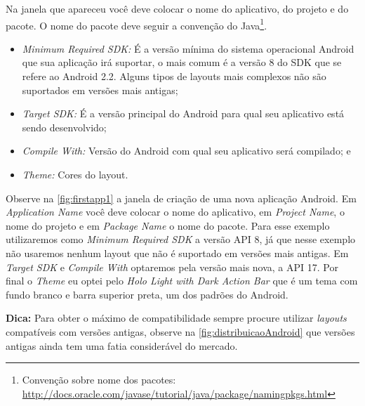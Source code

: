 \documentclass[a4paper,12pt,brazil,oneside]{book}
\begin{document}
\begin{singlespace}
Na janela que apareceu você deve colocar o nome do aplicativo, do projeto e do pacote. O nome do pacote deve seguir a convenção do Java\footnote{Convenção sobre nome dos pacotes: \href{http://docs.oracle.com/javase/tutorial/java/package/namingpkgs.html}{http://docs.oracle.com/javase/tutorial/java/package/namingpkgs.html}}.
\begin{itemize}
	\item \textit{Minimum Required SDK:} É a versão mínima do sistema operacional Android que sua aplicação irá suportar, o mais comum é a versão 8 do SDK que se refere ao Android 2.2. Alguns tipos de layouts mais complexos não são suportados em versões mais antigas;
	\item \textit{Target SDK:} É a versão principal do Android para qual seu aplicativo está sendo desenvolvido;
	\item \textit{Compile With:} Versão do Android com qual seu aplicativo será compilado; e
	\item \textit{Theme:} Cores do layout.
\end{itemize}

Observe na \autoref{fig:firstapp1} a janela de criação de uma nova aplicação Android. Em \emph{Application Name} você deve colocar o nome do aplicativo, em \emph{Project Name}, o nome do projeto e em \emph{Package Name} o nome do pacote. Para esse exemplo utilizaremos como \emph{Minimum Required SDK} a versão API 8, já que nesse exemplo não usaremos nenhum layout que não é suportado em versões mais antigas. Em \emph{Target SDK} e \emph{Compile With} optaremos pela versão mais nova, a API 17. Por final o \emph{Theme} eu optei pelo \emph{Holo Light with Dark Action Bar} que é um tema com fundo branco e barra superior preta, um dos padrões do Android.

\begin{framed}
\textbf{Dica:} Para obter o máximo de compatibilidade sempre procure utilizar \emph{layouts} compatíveis com versões antigas, observe na \autoref{fig:distribuicaoAndroid} que versões antigas ainda tem uma fatia considerável do mercado.
\end{framed}


\end{singlespace}
\end{document}
